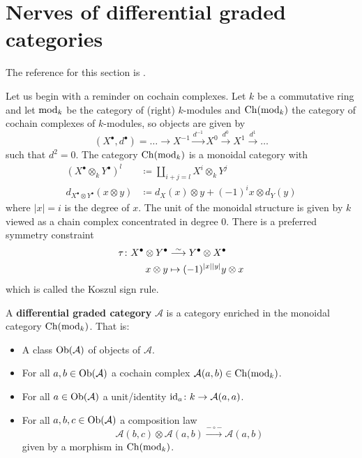 \section{Nerves of differential graded categories}

The reference for this section is \cite[ch. 2.5]{kerodon}.

Let us begin with a reminder on cochain complexes.
Let $ k $ be a commutative ring and let $ \operatorname{mod}_k $ be the category of (right) $ k $-modules
and $ \operatorname{Ch} ( \operatorname{mod}_k ) $ the category of cochain complexes of $ k $-modules, so objects are given by
\[
	( X^\bullet , d^\bullet )
	=
	\dotsc 
	\to 
	X^{ - 1 }
	\xrightarrow{ d^{ - 1 } }
	X^0
	\xrightarrow{ d^0 }
	X^1
	\xrightarrow{ d^1 } 
	\dotsc 
\]
such that $ d^2 = 0 $.
The category $ \operatorname{Ch} ( \operatorname{mod}_k ) $ is a monoidal category with 
\begin{align*}
	( X^\bullet \otimes_k Y^\bullet )^l 
	&\coloneqq
	\coprod_{ i + j = l } X^i \otimes_k Y^j 
	\\
	d_{ X^\bullet \otimes Y^\bullet } ( x \otimes y )
	&\coloneqq 
	d_X ( x ) \otimes y 
	+
	( - 1 )^i x \otimes d_Y ( y ) 
\end{align*}
where $ \lvert x \rvert = i $ is the degree of $ x $.
The unit of the monoidal structure is given by $ k $ viewed as a chain complex concentrated in degree $ 0 $.
There is a preferred symmetry constraint 
\begin{align*}
	\tau \colon X^\bullet \otimes Y^\bullet
	&\isomorphism
	Y^\bullet \otimes X^\bullet 
	\\
	x \otimes y 
	&\mapsto
	( - 1 )^{ \lvert x \rvert \lvert y \rvert }
	y \otimes x 
\end{align*}
which is called the Koszul sign rule.

\begin{defi}
\label{dg_category}
	A \textbf{differential graded category} $ \mathcal{ A } $ is a category enriched in the monoidal category $ \operatorname{Ch} ( \operatorname{mod}_k ) $.
	That is:
	\begin{itemize}
		\item 
		A class $ \operatorname{Ob} ( \mathcal{ A } ) $ of objects of $ \mathcal{ A } $.
		
		\item 
		For all $ a , b \in \operatorname{Ob} ( \mathcal{ A } ) $ a cochain complex $ \mathcal{ A } ( a , b ) \in \operatorname{Ch} ( \operatorname{mod}_k ) $.
		
		\item 
		For all $ a  \in \operatorname{Ob} ( \mathcal{ A } ) $ a unit/identity $ \operatorname{id}_a  \colon k \to \mathcal{ A } ( a , a ) $.
		
		\item 
		For all $ a , b, c \in \operatorname{Ob}( \mathcal{ A } ) $ a composition law 
		\[
			\mathcal{ A }( b , c ) \otimes \mathcal{ A } ( a , b ) 
			\xrightarrow{ - \circ - }
			\mathcal{ A } ( a , b )
		\]
		given by a morphism in $ \operatorname{Ch} ( \operatorname{mod}_k ) $.
	\end{itemize}
\end{defi}

